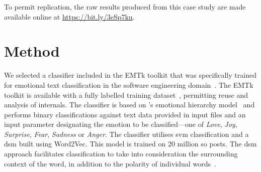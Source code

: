 
To permit replication, the raw results produced from this case study are made available online at \url{https://bit.ly/3eSp7ku}.

\section{Method}
We selected a classifier included in the EMTk toolkit that was specifically trained for emotional text classification in the software engineering domain~\citep{calefato2017}. The EMTk toolkit is available with a fully labelled training dataset~\citep{novielli2018}, permitting reuse and analysis of internals.  The classifier is based on \citeauthor{shaver1987}'s emotional hierarchy model~\citep{shaver1987} and performs binary classifications against text data provided in input files and an input parameter designating the emotion to be classified---one of \textit{Love}, \textit{Joy}, \textit{Surprise}, \textit{Fear}, \textit{Sadness} or \textit{Anger}. The classifier utilises \gls{svm} classification and a \gls{dsm} built using Word2Vec. This model is trained on 20 million \gls{so} posts. The \gls{dsm} approach facilitates classification to take into consideration the surrounding context of the word, in addition to the polarity of individual words~\citep{calefato2018}.   


